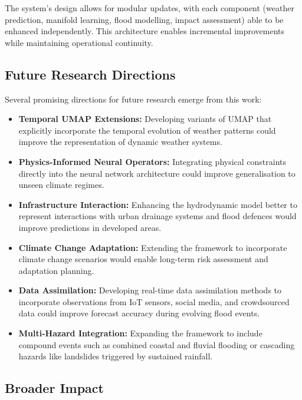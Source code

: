 \documentclass{article}
\begin{document}
The system's design allows for modular updates, with each component (weather prediction, manifold learning, flood modelling, impact assessment) able to be enhanced independently. This architecture enables incremental improvements while maintaining operational continuity.

\subsection{Future Research Directions}

Several promising directions for future research emerge from this work:

\begin{itemize}
    \item \textbf{Temporal UMAP Extensions:} Developing variants of UMAP that explicitly incorporate the temporal evolution of weather patterns could improve the representation of dynamic weather systems.
    
    \item \textbf{Physics-Informed Neural Operators:} Integrating physical constraints directly into the neural network architecture could improve generalisation to unseen climate regimes.
    
    \item \textbf{Infrastructure Interaction:} Enhancing the hydrodynamic model better to represent interactions with urban drainage systems and flood defences would improve predictions in developed areas.
    
    \item \textbf{Climate Change Adaptation:} Extending the framework to incorporate climate change scenarios would enable long-term risk assessment and adaptation planning.
    
    \item \textbf{Data Assimilation:} Developing real-time data assimilation methods to incorporate observations from IoT sensors, social media, and crowdsourced data could improve forecast accuracy during evolving flood events.
    
    \item \textbf{Multi-Hazard Integration:} Expanding the framework to include compound events such as combined coastal and fluvial flooding or cascading hazards like landslides triggered by sustained rainfall.
\end{itemize}

\subsection{Broader Impact}
\end{document}
